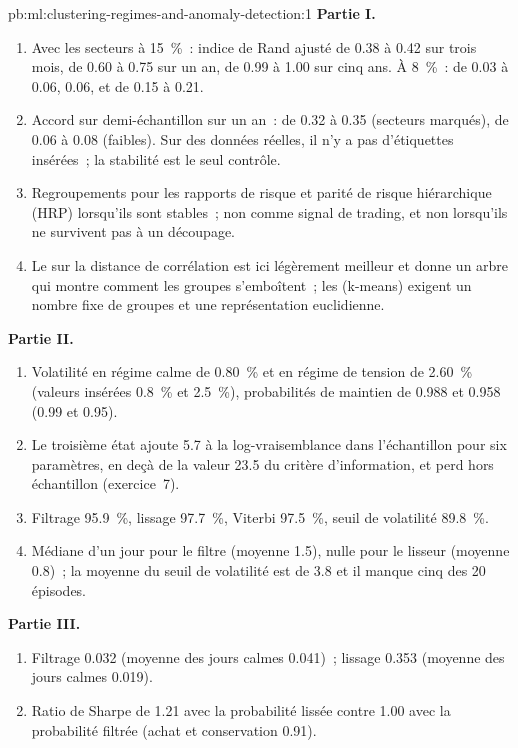 \begin{solution}{pb:ml:clustering-regimes-and-anomaly-detection:1}
\textbf{Partie I.}
\begin{enumerate}
\item Avec les secteurs à 15~\%~: indice de Rand ajusté de 0.38 à 0.42 sur trois mois, de 0.60 à 0.75 sur un an, de 0.99 à 1.00 sur cinq
ans. À 8~\%~: de 0.03 à 0.06, 0.06, et de 0.15 à 0.21.
\item Accord sur demi-échantillon sur un an~: de 0.32 à 0.35 (secteurs marqués), de 0.06 à 0.08 (faibles). Sur des données réelles, il n'y a pas
d'étiquettes insérées~; la stabilité est le seul contrôle.
\item Regroupements pour les rapports de risque et parité de risque hiérarchique (HRP) lorsqu'ils sont stables~; non comme signal de trading, et non lorsqu'ils ne
survivent pas à un découpage.
\item Le  sur la distance de corrélation est ici légèrement meilleur et donne un arbre qui montre comment les groupes
s'emboîtent~; les  (k-means) exigent un nombre fixe de groupes et une représentation euclidienne.
\end{enumerate}
\textbf{Partie II.}
\begin{enumerate}[resume]
\item Volatilité en régime calme de 0.80~\% et en régime de tension de 2.60~\% (valeurs insérées 0.8~\% et 2.5~\%), probabilités de maintien de 0.988 et 0.958 (0.99 et
0.95).
\item Le troisième état ajoute 5.7 à la log-vraisemblance dans l'échantillon pour six paramètres, en deçà de la valeur 23.5 du critère d'information, et
perd hors échantillon (exercice~7).
\item Filtrage 95.9~\%, lissage 97.7~\%, Viterbi 97.5~\%, seuil de volatilité 89.8~\%.
\item Médiane d'un jour pour le filtre (moyenne 1.5), nulle pour le lisseur (moyenne 0.8)~; la moyenne du seuil de volatilité est de 3.8 et il
manque cinq des 20 épisodes.
\end{enumerate}
\textbf{Partie III.}
\begin{enumerate}[resume]
\item Filtrage 0.032 (moyenne des jours calmes 0.041)~; lissage 0.353 (moyenne des jours calmes 0.019).
\item Ratio de Sharpe de 1.21 avec la probabilité lissée contre 1.00 avec la probabilité filtrée (achat et conservation 0.91).

\end{enumerate}
\end{solution}
